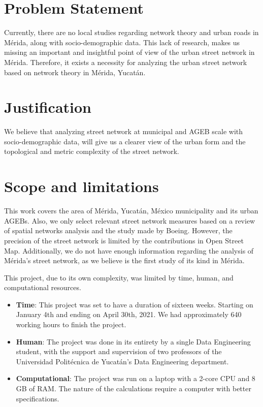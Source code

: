 \section{Problem Statement} 

Currently, there are no local studies regarding network theory and urban roads in Mérida, along with socio-demographic data. This lack of research, makes us missing an important and insightful point of view of the urban street network in Mérida. Therefore, it exists a necessity for analyzing the urban street network based on network theory in Mérida, Yucatán.

\section{Justification}

We believe that analyzing street network at municipal and AGEB scale with socio-demographic data, will give us a clearer view of the urban form and the topological and metric complexity of the street network. 


\section{Scope and limitations}

This work covers the area of Mérida, Yucatán, México municipality and its urban AGEBs. Also, we only select relevant street network measures based on a review of spatial networks analysis and the study \cite{boeing_multi-scale_2018} made by Boeing. However, the precision of the street network is limited by the contributions in Open Street Map. Additionally, we do not have enough information regarding the analysis of Mérida's street network, as we believe is the first study of its kind in Mérida.

This project, due to its own complexity, was limited by time, human, and computational resources.

\begin{itemize}
	\item \textbf{Time}: This project was set to have a duration of sixteen weeks. Starting on January 4th and ending on April 30th, 2021. We had approximately 640 working hours to finish the project.
	\item \textbf{Human}: The project was done in its entirety by a single Data Engineering student, with the support and supervision of two professors of the Universidad Politécnica de Yucatán's Data Engineering department.
	\item \textbf{Computational}: The project was run on a laptop with a 2-core CPU and 8 GB of RAM. The nature of the calculations require a computer with better specifications.
\end{itemize}

